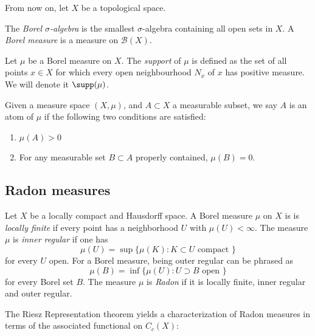 From now on, let $X$ be a topological space.

\begin{definition}
The \emph{Borel $\sigma$-algebra} is the smallest $\sigma$-algebra containing all open sets in $X$. A \emph{Borel measure} is a measure on $\mathcal{B}(X)$.
\end{definition}

\begin{definition}
Let $\mu$ be a Borel measure on $X$. The \emph{support} of $\mu$ is defined as the set of all points $x \in X$ for which every open neighbourhood $N_x$ of $x$ has positive measure. We will denote it $\supp(\mu)$.
\label{def:support}
\end{definition}

\begin{definition}
Given a measure space $(X,\mu)$, and $A\subset X$ a measurable subset, we say $A$ is an atom of $\mu$ if the following two conditions are satisfied:
\begin{enumerate}
    \item $\mu(A) > 0$
    \item For any measurable set $B \subset A$ properly contained, $\mu(B)=0$.
\end{enumerate}
\label{def:atommeasure}
\end{definition}

\subsection{Radon measures}

\begin{definition}
Let $X$ be a locally compact and Hausdorff space. A Borel measure $\mu$ on $X$ is  is \emph{locally finite} if every point has a neighborhood $U$ with $\mu(U)< \infty$.
The measure $\mu$ is \emph{inner regular} if one has
\[
\mu(U) = \sup \{ \mu(K) : K \subset U \mbox{ compact } \}
\]
for every $U$ open.
For a Borel measure, being outer regular can be phrased as
\[
   \mu(B) = \inf \{ \mu(U) : U \supset B \mbox{ open } \}
\]
for every Borel set $B$. The measure $\mu$ is \emph{Radon} if it is locally finite, inner regular and outer regular.
\label{def:radon}
\end{definition}

The Riesz Representation theorem yields a characterization of Radon measures in terms of the associated functional on $C_c(X)$:

